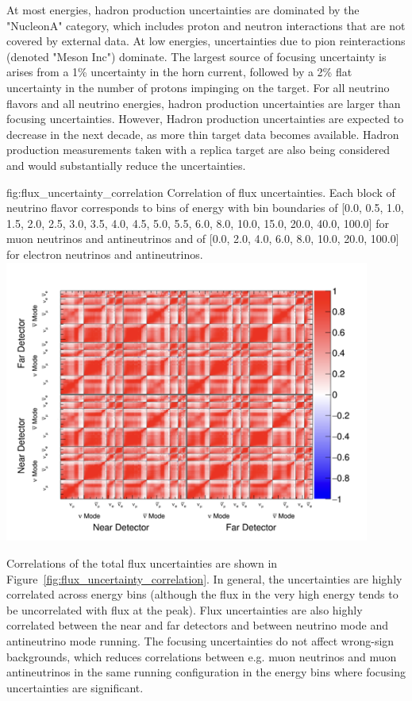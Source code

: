 At most energies, hadron production uncertainties are dominated by the "NucleonA" category, which includes proton and neutron interactions that are not covered by external data.  At low energies, uncertainties due to pion reinteractions (denoted "Meson Inc") dominate.   The largest source of focusing uncertainty is arises from a 1\% uncertainty in the horn current, followed by a 2\% flat uncertainty in the number of protons impinging on the target.   For all neutrino flavors and all neutrino energies, hadron production uncertainties are larger than focusing uncertainties.  However, Hadron production uncertainties are expected to decrease in the next decade, as more thin target data becomes available.  Hadron production measurements taken with a replica target are also being considered and would substantially reduce the uncertainties.  


\begin{dunefigure}{fig:flux_uncertainty_correlation}
{Correlation of flux uncertainties.  Each block of neutrino flavor corresponds to bins of energy with bin boundaries of [0.0, 0.5, 1.0, 1.5, 2.0, 2.5, 3.0, 3.5, 4.0, 4.5, 5.0, 5.5, 6.0, 8.0, 10.0, 15.0, 20.0, 40.0, 100.0] for muon neutrinos and antineutrinos and of [0.0, 2.0, 4.0, 6.0, 8.0, 10.0, 20.0, 100.0] for electron neutrinos and antineutrinos. }
    \includegraphics[width=0.9\textwidth]{graphics/correlation_ndtf_opt.png}\end{dunefigure}

Correlations of the total flux uncertainties are shown in Figure~\ref{fig:flux_uncertainty_correlation}.  In general, the uncertainties are highly correlated across energy bins (although the flux in the very high energy tends to be uncorrelated with flux at the peak).  Flux uncertainties are also highly correlated between the near and far detectors and between neutrino mode and antineutrino mode running.  The focusing uncertainties do not affect wrong-sign backgrounds, which reduces correlations between e.g. muon neutrinos and muon antineutrinos in the same running configuration in the energy bins where focusing uncertainties are significant.    


